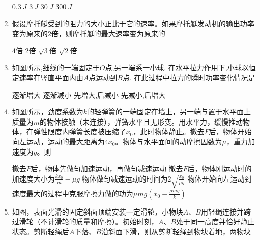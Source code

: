 \begin{enumerate}[leftmargin=0em]
\fourchoices
{$ 0.3\ J $ }
{$ 3\ J $}
{$ 30\ J $ }
{$ 300\ J $}




\item 
{}
假设摩托艇受到的阻力的大小正比于它的速率。如果摩托艇发动机的输出功率变为原来的$ 2 $倍，则摩托艇的最大速率变为原来的  

\fourchoices
{$ 4 $倍 }
{$ 2 $倍}
{$\sqrt{3}$倍}
{$\sqrt{2}$倍}



\item
{}
如图所示,细线的一端固定于$ O $点,另一端系一小球. 在水平拉力作用下,小球以恒定速率在竖直平面内由$ A $点运动到$ B $点. 在此过程中拉力的瞬时功率变化情况是  
\begin{figure}[h!]
\centering

\end{figure}



\fourchoices
{逐渐增大}
{逐渐减小}
{先增大,后减小}
{先减小,后增大}




\item 
{}
如图所示，劲度系数为$ k $的轻弹簧的一端固定在墙上，另一端与置于水平面上质量为$ m $的物体接触（未连接），弹簧水平且无形变。用水平力，缓慢推动物体，在弹性限度内弹簧长度被压缩了$ x_{0} $，此时物体静止。撤去$ F $后，物体开始向左运动，运动的最大距离为$ 4x_0 $。物体与水平面间的动摩擦因数为$ \mu $，重力加速度为$ g $。则  
\begin{figure}[h!]
\centering

\end{figure}

\fourchoices
{撤去$ F $后，物体先做匀加速运动，再做匀减速运动}
{撤去$ F $后，物体刚运动时的加速度大小为$\frac { k x _ { 0 } } { m } - \mu g$}
{物体做匀减速运动的时间为$2 \sqrt{ \frac { x _ { 0 } } { \mu g } }$}
{物体开始向左运动到速度最大的过程中克服摩擦力做的功为$\mu m g \left( x _ { 0 } - \frac { \mu m g } { k } \right)$}


\item
{}
如图，表面光滑的固定斜面顶端安装一定滑轮，小物块$ A $、$ B $用轻绳连接并跨过滑轮（不计滑轮的质量和摩擦）。初始时刻，$ A $、$ B $处于同一高度并恰好静止状态。剪断轻绳后$ A $下落、$ B $沿斜面下滑，则从剪断轻绳到物块着地，两物块  
\begin{figure}[h!]
\centering

\end{figure}


\end{enumerate}
